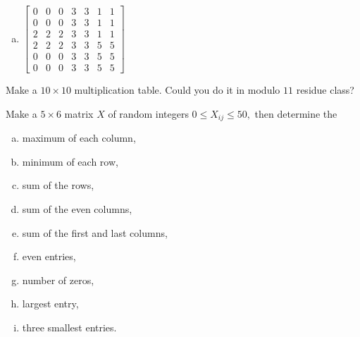 \documentclass[a4paper, fleqn, 10pt]{report}
\theoremstyle{definition}
\newenvironment{prb*}[1]
  {\renewcommand\theprb{\thechapter.\arabic{prb}\rlap{$^{#1}$}}\prb}
  {\endprb}
\begin{document}
\begin{prb*}{2}
\begin{multicols}{3}
\begin{enumerate}[a)]
\item $\displaystyle
\begin{bmatrix}
0 & 0 & 0 & 3 & 3 & 1 & 1\\
0 & 0 & 0 & 3 & 3 & 1 & 1\\
2 & 2 & 2 & 3 & 3 & 1 & 1\\
2 & 2 & 2 & 3 & 3 & 5 & 5\\
0 & 0 & 0 & 3 & 3 & 5 & 5\\
0 & 0 & 0 & 3 & 3 & 5 & 5
\end{bmatrix}
$
\end{enumerate}
\end{multicols}
\end{prb*}

\begin{prb*}{1}
Make a $10\times10$ multiplication table. Could you do it in modulo $11$ residue class?
\end{prb*}

\begin{prb*}{2}
Make a $5\times6$ matrix $X$ of random integers $0\le X_{ij}\le 50,$
then determine the
\begin{multicols}{3}
\begin{enumerate}[a)]
 \item maximum of each column,
 \item minimum of each row,
 \item sum of the rows,
 \item sum of the even columns,
 \item sum of the first and last columns,
 \item even entries,
 \item number of zeros,
 \item largest entry,
 \item three smallest entries.
\end{enumerate}
\end{multicols}
\end{prb*}
\end{document}
